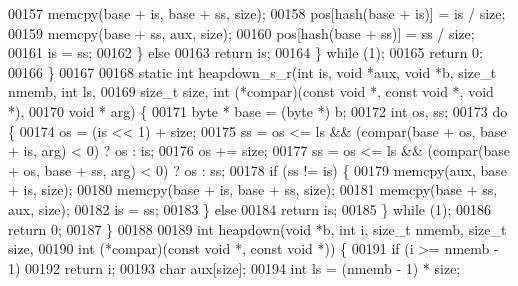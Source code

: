 \begin{DoxyCode}
00157                         memcpy(base + is, base + ss, size);
00158                         pos[hash(base + is)] = is / size;
00159                         memcpy(base + ss, aux, size);
00160                         pos[hash(base + ss)] = ss / size;
00161                         is = ss;
00162                 \} \textcolor{keywordflow}{else}
00163                         \textcolor{keywordflow}{return} is;
00164         \} \textcolor{keywordflow}{while} (1);
00165         \textcolor{keywordflow}{return} 0;
00166 \}
00167 
00168 \textcolor{keyword}{static} \textcolor{keywordtype}{int} heapdown\_s\_r(\textcolor{keywordtype}{int} is, \textcolor{keywordtype}{void} *aux, \textcolor{keywordtype}{void} *b, \textcolor{keywordtype}{size\_t} nmemb, \textcolor{keywordtype}{int} ls,
00169                 \textcolor{keywordtype}{size\_t} size, \textcolor{keywordtype}{int} (*compar)(\textcolor{keyword}{const} \textcolor{keywordtype}{void} *, \textcolor{keyword}{const} \textcolor{keywordtype}{void} *, \textcolor{keywordtype}{void} *),
00170                 \textcolor{keywordtype}{void} * arg) \{
00171         byte * base = (byte *) b;
00172         \textcolor{keywordtype}{int} os, ss;
00173         \textcolor{keywordflow}{do} \{
00174                 os = (is << 1) + size;
00175                 ss = os <= ls && (compar(base + os, base + is, arg) < 0) ? os : is;
00176                 os += size;
00177                 ss = os <= ls && (compar(base + os, base + ss, arg) < 0) ? os : ss;
00178                 \textcolor{keywordflow}{if} (ss != is) \{
00179                         memcpy(aux, base + is, size);
00180                         memcpy(base + is, base + ss, size);
00181                         memcpy(base + ss, aux, size);
00182                         is = ss;
00183                 \} \textcolor{keywordflow}{else}
00184                         \textcolor{keywordflow}{return} is;
00185         \} \textcolor{keywordflow}{while} (1);
00186         \textcolor{keywordflow}{return} 0;
00187 \}
00188 
00189 \textcolor{keywordtype}{int} heapdown(\textcolor{keywordtype}{void} *b, \textcolor{keywordtype}{int} i, \textcolor{keywordtype}{size\_t} nmemb, \textcolor{keywordtype}{size\_t} size,
00190                 \textcolor{keywordtype}{int} (*compar)(\textcolor{keyword}{const} \textcolor{keywordtype}{void} *, \textcolor{keyword}{const} \textcolor{keywordtype}{void} *)) \{
00191         \textcolor{keywordflow}{if} (i >= nmemb - 1)
00192                 \textcolor{keywordflow}{return} i;
00193         \textcolor{keywordtype}{char} aux[size];
00194         \textcolor{keywordtype}{int} ls = (nmemb - 1) * size;

\end{DoxyCode}
